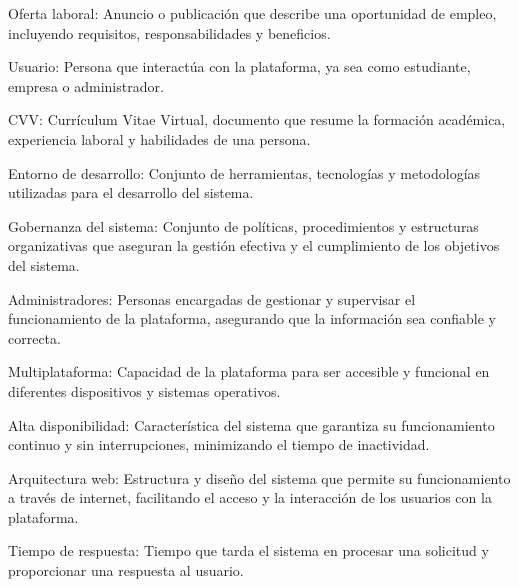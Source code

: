 \documentclass[11pt,a4paper]{Plantilla}
\begin{document}
Oferta laboral: Anuncio o publicación que describe una oportunidad de empleo, incluyendo requisitos, responsabilidades y beneficios.

\vspace{5pt}

Usuario: Persona que interactúa con la plataforma, ya sea como estudiante, empresa o administrador.

\vspace{5pt}

CVV: Currículum Vitae Virtual, documento que resume la formación académica, experiencia laboral y habilidades de una persona.

\vspace{5pt}

Entorno de desarrollo: Conjunto de herramientas, tecnologías y metodologías utilizadas para el desarrollo del sistema.

\vspace{5pt}

Gobernanza del sistema: Conjunto de políticas, procedimientos y estructuras organizativas que aseguran la gestión efectiva y el cumplimiento de los objetivos del sistema.

\vspace{5pt}

Administradores: Personas encargadas de gestionar y supervisar el funcionamiento de la plataforma, asegurando que la información sea confiable y correcta.

\vspace{5pt}

Multiplataforma: Capacidad de la plataforma para ser accesible y funcional en diferentes dispositivos y sistemas operativos.

\vspace{5pt}

Alta disponibilidad: Característica del sistema que garantiza su funcionamiento continuo y sin interrupciones, minimizando el tiempo de inactividad.

\vspace{5pt}

Arquitectura web: Estructura y diseño del sistema que permite su funcionamiento a través de internet, facilitando el acceso y la interacción de los usuarios con la plataforma.

\vspace{5pt}

Tiempo de respuesta: Tiempo que tarda el sistema en procesar una solicitud y proporcionar una respuesta al usuario.
\end{document}
